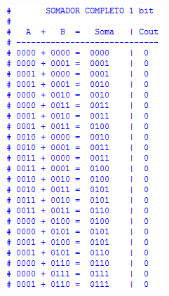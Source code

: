 	\begin{figure}[H]
		\centering

		\begin{subfigure}[b]{0.44\textwidth}
			\includegraphics[width=\textwidth]{img/etapa3/simulacaoSomadorCompleto4Bits_1}
			\label{fig:etapa3-1}
		\end{subfigure}
		~
		\begin{subfigure}[b]{0.44\textwidth}

\end{subfigure}
\end{figure}
